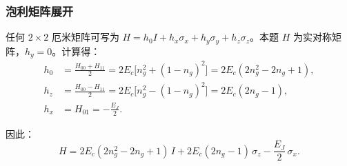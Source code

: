 \subsubsection{泡利矩阵展开}

任何 $2\times 2$ 厄米矩阵可写为 $H = h_0 I + h_x \sigma_x + h_y \sigma_y + h_z \sigma_z$。本题 $H$ 为实对称矩阵，$h_y = 0$。计算得：
\begin{align*}
h_0 &= \frac{H_{00}+H_{11}}{2} = 2E_c\bigl[n_g^2 + (1-n_g)^2\bigr] = 2E_c(2n_g^2 - 2n_g + 1), \\[4pt]
h_z &= \frac{H_{00}-H_{11}}{2} = 2E_c\bigl[n_g^2 - (1-n_g)^2\bigr] = 2E_c(2n_g - 1), \\[4pt]
h_x &= H_{01} = -\frac{E_J}{2}.
\end{align*}

因此：
\[
\boxed{H = 2E_c(2n_g^2 - 2n_g + 1) \, I + 2E_c(2n_g - 1) \, \sigma_z - \frac{E_J}{2} \, \sigma_x}.
\]

